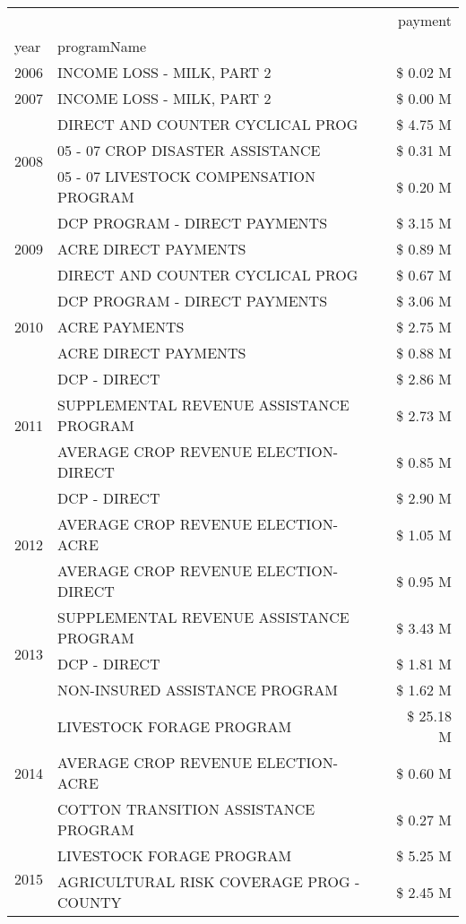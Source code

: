 \begin{tabular}{llr}
\toprule
 &  & payment \\
year & programName &  \\
\midrule
2006 & INCOME LOSS - MILK, PART 2 & \$ 0.02 M \\
\cline{1-3}
2007 & INCOME LOSS - MILK, PART 2 & \$ 0.00 M \\
\cline{1-3}
\multirow[t]{3}{*}{2008} & DIRECT AND COUNTER CYCLICAL PROG & \$ 4.75 M \\
 & 05 - 07 CROP DISASTER ASSISTANCE & \$ 0.31 M \\
 & 05 - 07 LIVESTOCK COMPENSATION PROGRAM & \$ 0.20 M \\
\cline{1-3}
\multirow[t]{3}{*}{2009} & DCP PROGRAM - DIRECT PAYMENTS & \$ 3.15 M \\
 & ACRE DIRECT PAYMENTS & \$ 0.89 M \\
 & DIRECT AND COUNTER CYCLICAL PROG & \$ 0.67 M \\
\cline{1-3}
\multirow[t]{3}{*}{2010} & DCP PROGRAM - DIRECT PAYMENTS & \$ 3.06 M \\
 & ACRE PAYMENTS & \$ 2.75 M \\
 & ACRE DIRECT PAYMENTS & \$ 0.88 M \\
\cline{1-3}
\multirow[t]{3}{*}{2011} & DCP - DIRECT & \$ 2.86 M \\
 & SUPPLEMENTAL REVENUE ASSISTANCE PROGRAM & \$ 2.73 M \\
 & AVERAGE CROP REVENUE ELECTION-DIRECT & \$ 0.85 M \\
\cline{1-3}
\multirow[t]{3}{*}{2012} & DCP - DIRECT & \$ 2.90 M \\
 & AVERAGE CROP REVENUE ELECTION-ACRE & \$ 1.05 M \\
 & AVERAGE CROP REVENUE ELECTION-DIRECT & \$ 0.95 M \\
\cline{1-3}
\multirow[t]{3}{*}{2013} & SUPPLEMENTAL REVENUE ASSISTANCE PROGRAM & \$ 3.43 M \\
 & DCP - DIRECT & \$ 1.81 M \\
 & NON-INSURED ASSISTANCE PROGRAM & \$ 1.62 M \\
\cline{1-3}
\multirow[t]{3}{*}{2014} & LIVESTOCK FORAGE PROGRAM & \$ 25.18 M \\
 & AVERAGE CROP REVENUE ELECTION-ACRE & \$ 0.60 M \\
 & COTTON TRANSITION ASSISTANCE PROGRAM & \$ 0.27 M \\
\cline{1-3}
\multirow[t]{3}{*}{2015} & LIVESTOCK FORAGE PROGRAM & \$ 5.25 M \\
 & AGRICULTURAL RISK COVERAGE PROG - COUNTY & \$ 2.45 M \\

\end{tabular}
